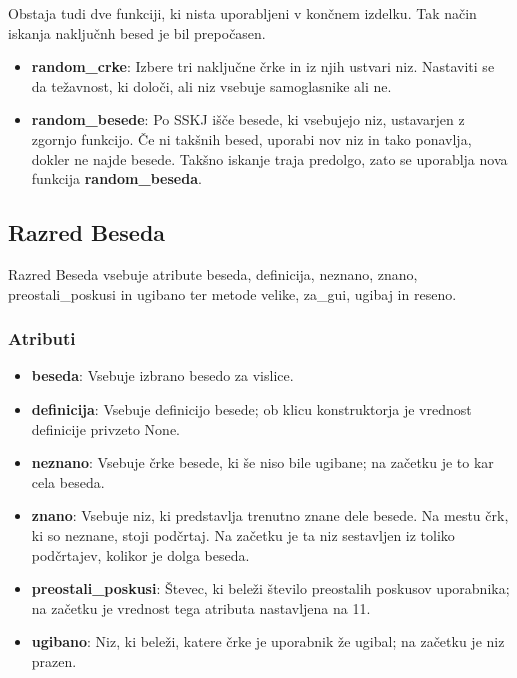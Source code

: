 \documentclass [a4paper, 12pt] {article}
\begin{document}
Obstaja tudi dve funkciji, ki nista uporabljeni v končnem izdelku. Tak način iskanja naključnh besed je bil prepočasen.
\begin {itemize}
\item \textbf {random\_crke}: Izbere tri naključne črke in iz njih ustvari niz. Nastaviti se da težavnost, ki določi, ali niz vsebuje samoglasnike ali ne.
\item \textbf {random\_besede}: Po SSKJ išče besede, ki vsebujejo niz, ustavarjen z zgornjo funkcijo. Če ni takšnih besed, uporabi nov niz in tako ponavlja, dokler ne najde besede. Takšno iskanje traja predolgo, zato se uporablja nova funkcija \textbf {random\_beseda}.
\end {itemize}

\subsection {Razred Beseda}
Razred Beseda vsebuje atribute beseda, definicija, neznano, znano, preostali\_poskusi in ugibano ter metode velike, za\_gui, ugibaj in reseno.
\subsubsection {Atributi}
\begin {itemize}
\item \textbf {beseda}: Vsebuje izbrano besedo za vislice.
\item \textbf {definicija}: Vsebuje definicijo besede; ob klicu konstruktorja je vrednost definicije privzeto None.
\item \textbf {neznano}: Vsebuje črke besede, ki še niso bile ugibane; na začetku je to kar cela beseda. 
\item \textbf {znano}: Vsebuje niz, ki predstavlja trenutno znane dele besede. Na mestu črk, ki so neznane, stoji podčrtaj. Na začetku je ta niz sestavljen iz toliko podčrtajev, kolikor je dolga beseda.
\item \textbf {preostali\_poskusi}: Števec, ki beleži število preostalih poskusov uporabnika; na začetku je vrednost tega atributa nastavljena na 11. 
\item \textbf {ugibano}: Niz, ki beleži, katere črke je uporabnik že ugibal; na začetku je niz prazen.
\end {itemize}
\end{document}

